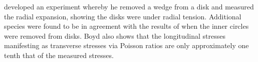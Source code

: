 \citet{boyd1950a} developed an experiment whereby he removed a wedge from a disk
and measured the radial expansion, showing the disks were under radial
tension. Additional species were found to be in agreement with the
results of \citet{jacobs1945l} when the inner circles were removed from disks. Boyd also shows
that the longitudinal stresses manifesting as transverse stresses via Poisson
ratios are only approximately one tenth that of the measured stresses.
